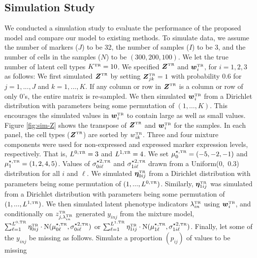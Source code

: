 \documentclass[12pt,]{article}
\newcommand{\N}{ \mathcal{N} }
\def\bet{\bm{\eta}}
\def\N{\text{N}}
\newcommand{\true}{{\mbox{\tiny TR}}}
\newcommand{\bZ}{\mbox{\boldmath $Z$}}
\newcommand{\bw}{\mbox{\boldmath $w$}}
\begin{document}
\subsection{Simulation Study}\label{sec:CB-sim}
We conducted a simulation study to evaluate the performance of the proposed
model and compare our model to existing methods.
To simulate data, we assume the number of markers ($J$) to be 32, the number of
samples ($I$) to be 3, and the number of cells in the samples ($N$) to be
$(300, 200, 100)$.  We let the true number of latent cell types $K^\true=10$.
We specified $\bZ^\true$ and $\bw^\true_i$, for $i=1,2,3$ as follows: We first
simulated $\bZ^\true$ by setting $\bZ^\true_{jk}=1$ with probability 0.6 for
$j=1,...,J$ and $k=1,...,K$. If any column or row in $\bZ^\true$ is a column or
row of only 0's, the entire matrix is re-sampled.
We then simulated $\bw^\true_i$ from a Dirichlet distribution with parameters
being some permutation of $(1, \ldots,K)$. This encourages the simulated values
in $\bw^\true_i$ to contain large as well as small values.
%
Figure \ref{fig:sim-Z} shows the transpose of $\bZ^\true$ and $\bw^\true_i$ for
the samples. In each panel, the cell types ($\bZ^\true$) are sorted by
$w_{ik}^\true$.  Three and four mixture components were used for non-expressed
and expressed marker expression levels, respectively. That is, $L^{0, \true}=3$
and $L^{1, \true}=4$. We set  $\mu^{\star, \true}_{0} = (-5, -2, -1)$ and
$\mu^{\star, \true}_{1} = (1, 2, 4, 5)$. Values of $\sigma^{\star 2,
\true}_{0i\ell}$ and $\sigma^{\star 2,\true}_{1i\ell}$ drawn 
from a Uniform(0,~0.3) distribution for all $i$ and $\ell$.
%
We simulated $\bet_{0ij}^\true$ from a Dirichlet distribution with
parameters being some permutation of $(1,...,L^{0,\true})$. Similarly, 
$\bet_{1ij}^\true$ was simulated from a Dirichlet distribution with
parameters being some permutation of $(1,...,L^{1,\true})$.
%
We then simulated latent phenotype indicators $\lambda_{in}^\true$ using
$\bw_i^\true$, and conditionally on $z^\true_{j,\lambda_{in}^\true}$ generated
$y_{inj}$ from the mixture model, $\sum_{\ell=1}^{L^{0,\true}}
\eta^\true_{0ij}\cdot\N(\mu^{\star, \true}_{0\ell}, \sigma^{\star 2,
\true}_{0i\ell})$ or $\sum_{\ell=1}^{L^{1,\true}}
\eta^\true_{1ij}\cdot\N(\mu^{\star, \true}_{1\ell}, \sigma^{\star 2,
\true}_{1i\ell})$. Finally, let some of the $y_{inj}$
be missing as follows. Simulate a proportion $(p_{ij})$ of values to be missing
\end{document}
